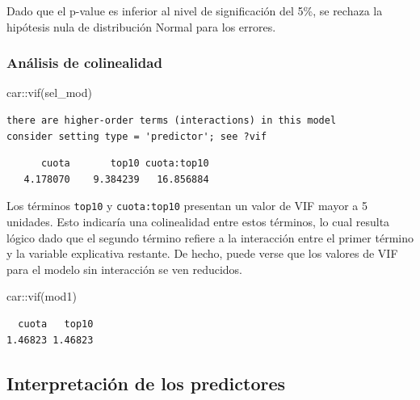 \documentclass[
  letterpaper,
  DIV=11,
  numbers=noendperiod]{scrartcl}
\newenvironment{Shaded}{\begin{snugshade}}{\end{snugshade}}
\newcommand{\FunctionTok}[1]{\textcolor[rgb]{0.28,0.35,0.67}{#1}}
\newcommand{\NormalTok}[1]{\textcolor[rgb]{0.00,0.23,0.31}{#1}}
\newcommand{\SpecialCharTok}[1]{\textcolor[rgb]{0.37,0.37,0.37}{#1}}
\begin{document}
Dado que el p-value es inferior al nivel de significación del 5\%, se
rechaza la hipótesis nula de distribución Normal para los errores.

\hypertarget{anuxe1lisis-de-colinealidad}{%
\subsubsection{Análisis de
colinealidad}\label{anuxe1lisis-de-colinealidad}}

\begin{Shaded}
\begin{Highlighting}[]
\NormalTok{car}\SpecialCharTok{::}\FunctionTok{vif}\NormalTok{(sel\_mod)}
\end{Highlighting}
\end{Shaded}

\begin{verbatim}
there are higher-order terms (interactions) in this model
consider setting type = 'predictor'; see ?vif
\end{verbatim}

\begin{verbatim}
      cuota       top10 cuota:top10 
   4.178070    9.384239   16.856884 
\end{verbatim}

Los términos \texttt{top10} y \texttt{cuota:top10} presentan un valor de
VIF mayor a 5 unidades. Esto indicaría una colinealidad entre estos
términos, lo cual resulta lógico dado que el segundo término refiere a
la interacción entre el primer término y la variable explicativa
restante. De hecho, puede verse que los valores de VIF para el modelo
sin interacción se ven reducidos.

\begin{Shaded}
\begin{Highlighting}[]
\NormalTok{car}\SpecialCharTok{::}\FunctionTok{vif}\NormalTok{(mod1)}
\end{Highlighting}
\end{Shaded}

\begin{verbatim}
  cuota   top10 
1.46823 1.46823 
\end{verbatim}

\hypertarget{interpretaciuxf3n-de-los-predictores}{%
\subsection{Interpretación de los
predictores}\label{interpretaciuxf3n-de-los-predictores}}
\end{document}
